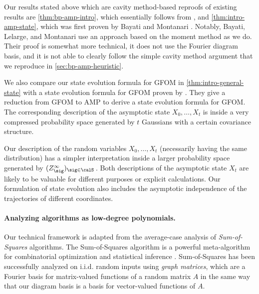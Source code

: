 \documentclass[12pt]{article}
\begin{document}
Our results stated above which are cavity method-based reproofs of existing results are \cref{thm:bp-amp-intro},
which essentially follows from 
\cite[Proposition 3]{bayati2015universality},
and \cref{thm:intro-amp-state}, which 
was first proven by Bayati and Montanari \cite{bayati2011dynamics}.
Notably, Bayati, Lelarge, and Montanari \cite{bayati2015universality} use an approach based on the moment method as we do.
Their proof is somewhat more technical, it does not use the Fourier diagram basis,
and it is not able to clearly follow the 
simple cavity method argument that we
reproduce in \cref{sec:bp-amp-heuristic}.

    We also compare our state evolution formula for GFOM in \cref{thm:intro-general-state}
    with a state evolution formula for GFOM proven by \cite{celentano2020estimation}.
    They give a reduction from GFOM to AMP to derive a state evolution formula for GFOM.
    The corresponding description of the asymptotic state $X_0, \dots, X_t$ is inside a very compressed probability space
    generated by $t$ Gaussians with a certain covariance structure.
    
    Our description of the random variables $X_0, \dots, X_t$ (necessarily having the same distribution)
    has a simpler interpretation inside a larger probability space generated by $(Z_\sig^\infty)_{\sig \in \calS}\,$.
    Both descriptions of the
    asymptotic state $X_t$ are likely to be valuable for different purposes or explicit calculations.
    Our formulation of state evolution also includes the asymptotic independence of the trajectories of different coordinates.

\paragraph{Analyzing algorithms as low-degree polynomials.}
Our technical framework is adapted from the average-case analysis of
\emph{Sum-of-Squares} algorithms.
The Sum-of-Squares algorithm is a powerful meta-algorithm
for combinatorial optimization and statistical inference \cite{raghavendra2018high, FKP:semialgebraicproofs}.
Sum-of-Squares has been successfully analyzed on i.i.d. random inputs using \emph{graph matrices},
which are a Fourier basis for matrix-valued functions of a random matrix $A$
in the same way that our diagram basis is a basis
for vector-valued functions of $A$.
\end{document}
